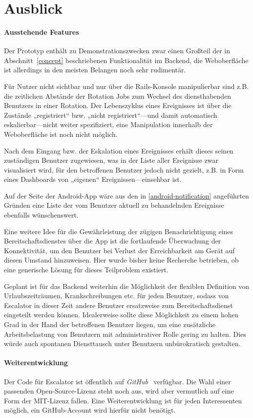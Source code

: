 \documentclass[11pt,utf8,notoc,bibnum,german,final]{zihpub}
\begin{document}

\section{Ausblick}

\paragraph{Ausstehende Features}

Der Prototyp enthält zu Demonstrationszwecken zwar einen Großteil der in
Abschnitt~\ref{concept} beschriebenen Funktionalität im Backend, die
Weboberfläche ist allerdings in den meisten Belangen noch sehr rudimentär.

Für Nutzer nicht sichtbar und nur über die Rails-Konsole manipulierbar sind
z.B. die zeitlichen Abstände der Rotation Jobs zum Wechsel des diensthabenden
Benutzers in einer Rotation. Der Lebenszyklus eines Ereignisses ist über die
Zustände „registriert“ bzw. „nicht registriert“—und damit automatisch
eskalierbar—nicht weiter spezifiziert, eine Manipulation innerhalb der
Weboberfläche ist noch nicht möglich.

Nach dem Eingang bzw. der Eskalation eines Ereignisses erhält dieses seinen
zuständigen Benutzer zugewiesen, was in der Liste aller Ereignisse zwar
visualisiert wird, für den betroffenen Benutzer jedoch nicht gezielt, z.B. in
Form eines Dashboards von „eigenen“ Ereignissen—einsehbar ist.

Auf der Seite der Android-App wäre aus den in \ref{android-notification}
angeführten Gründen eine Liste der vom Benutzer aktuell zu behandelnden
Ereignisse ebenfalls wünschenswert.

Eine weitere Idee für die Gewährleistung der zügigen Benachrichtigung eines
Bereitschaftsdienstes über die App ist die fortlaufende Überwachung der
Konnektivität, um den Benutzer bei Verlust der Erreichbarkeit am Gerät auf
diesen Umstand hinzuweisen. Hier wurde bisher keine Recherche betrieben, ob
eine generische Lösung für dieses Teilproblem existiert.

Geplant ist für das Backend weiterhin die Möglichkeit der flexiblen Definition
von Urlaubszeiträumen, Krankschreibungen etc. für jeden Benutzer, sodass von
Escalator in dieser Zeit andere Benutzer ersatzweise zum Bereitschaftsdienst
eingeteilt werden können. Idealerweise sollte diese Möglichkeit zu einem hohen
Grad in der Hand der betroffenen Benutzer liegen, um eine zusätzliche
Arbeitsbelastung von Benutzern mit administrativer Rolle gering zu halten. Dies
würde auch spontanen Diensttausch unter Benutzern unbürokratisch gestalten.


\paragraph{Weiterentwicklung}

Der Code für Escalator ist öffentlich auf \emph{GitHub}~\cite{escalator-github}
verfügbar. Die Wahl einer passenden Open-Source-Lizenz steht noch aus, wird
aber vermutlich auf eine Form der MIT-Lizenz fallen. Eine Weiterentwicklung ist
für jeden Interessenten möglich, ein GitHub-Account wird hierfür nicht benötigt.
\end{document}
